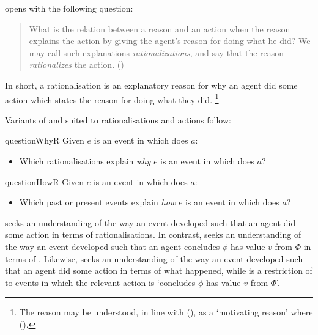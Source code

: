\begin{note}
  \citeauthor{Davidson:1963aa} opens  with the following question:
  \begin{quote}
    What is the relation between a reason and an action when the reason explains the action by giving the agent's reason for doing what he did?
    We may call such explanations \emph{rationalizations}, and say that the reason \emph{rationalizes} the action.%
    \mbox{}\hfill\mbox{(\citeyear[685]{Davidson:1963aa})}
  \end{quote}
  In short, a rationalisation is an explanatory reason for why an agent did some action which states the \agents{} reason for doing what they did.%
  \footnote{
    The \agents{} reason may be understood, in line with \citeauthor{Smith:1994wo} (\citeyear{Smith:1994wo}), as a `motivating reason' where
    (\citeyear[96]{Smith:1994wo}).
  }

  Variants of \qWhy{} and \qHow{} suited to rationalisations and actions follow:

  \begin{question}{questionWhyR}{\qWhyR{}}
    Given \(e\) is an event in which \vAgent{} does \(a\):

    \begin{itemize}
    \item
      Which rationalisations explain \emph{why} \(e\) is an event in which \vAgent{} does \(a\)?
    \end{itemize}
    \vspace{-1.5\baselineskip}
  \end{question}

  \begin{question}{questionHowR}{\qHowR{}}
    Given \(e\) is an event in which \vAgent{} does \(a\):

    \begin{itemize}
    \item
      Which past or present events explain \emph{how} \(e\) is an event in which \vAgent{} does \(a\)?
    \end{itemize}
    \vspace{-1.5\baselineskip}
  \end{question}

  \noindent%
  \qWhyR{} seeks an understanding of the way an event developed such that an agent did some action in terms of rationalisations.
  In contrast, \qWhy{} seeks an understanding of the way an event developed such that an agent concludes \(\phi\) has value \(v\) from \(\Phi\) in terms of \ros{}.
  Likewise, \qHowR{} seeks an understanding of the way an event developed such that an agent did some action in terms of what happened, while \qHow{} is a restriction of \qHowR{} to events in which the relevant action is `concludes \(\phi\) has value \(v\) from \(\Phi\)'.
\end{note}

